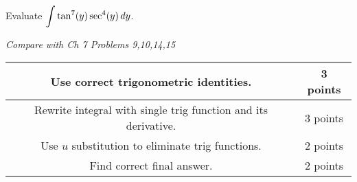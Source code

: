 \documentclass[12pt]{exam}
\newcommand{\ds}{\ensuremath{\displaystyle}}
\begin{document}
\begin{questions}
\vfill

\newpage

\question[10]
Evaluate $\ds\int \tan^7(y)\sec^4(y)\,dy$.

\textit{Compare with Ch 7 Problems 9,10,14,15}

\begin{center}
  \begin{tabular}{|c|c|}
    \hline
    Use correct trigonometric identities. & 3 points \\
    \hline
    Rewrite integral with single trig function and its derivative. & 3 points \\
    \hline
    Use $u$ substitution to eliminate trig functions. & 2 points \\
    \hline
    Find correct final answer. & 2 points \\
    \hline
  \end{tabular}
\end{center}

\vfill





\end{questions}
\end{document}
